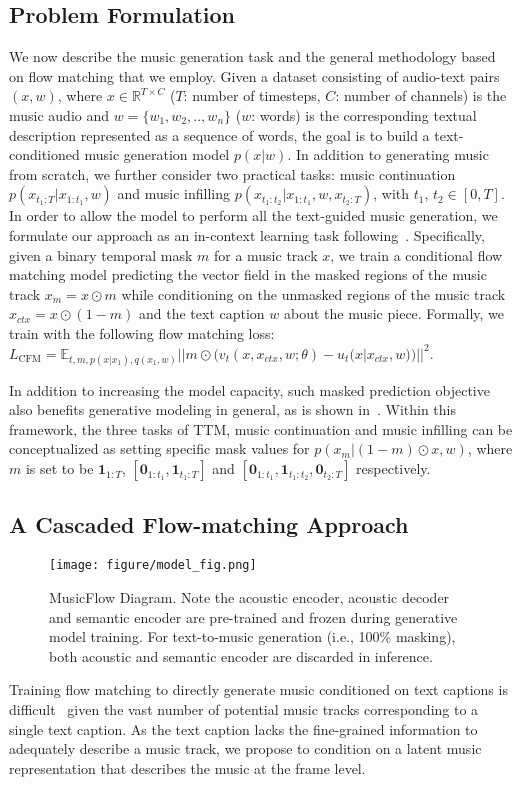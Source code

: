 \subsection{Problem Formulation}\label{sec:problem_formulation}
We now describe the music generation task and the general methodology based on flow matching that we employ.
Given a dataset consisting of audio-text pairs $(x, w)$, where $x\in\mathbb{R}^{T\times C}$ ($T$: number of timesteps, $C$: number of channels) is the music audio and $w=\{w_1,w_2,..,w_n\}$ ($w$: words) 
is the corresponding textual description represented as a sequence of words, the goal is to build a text-conditioned music generation model $p(x|w)$. In addition to generating music from scratch, we further consider two practical tasks: music continuation 
$p(x_{t_1:T}|x_{1:t_1}, w)$
and music infilling $p(x_{t_1:t_2}|x_{1:t_1}, w, x_{t_2:T})$, with $t_1$, $t_2\in[0,T]$.
In order to allow the model to perform all the text-guided music generation, we formulate our approach as an in-context learning task following~\cite{Le2023VoiceboxTM}. Specifically, given a binary temporal mask $m$ for a music track $x$, we train a conditional flow matching model predicting the vector field in the masked regions of the music track $x_{m} = x \odot m$ while conditioning on the
 unmasked regions of the music track $x_{ctx} = x \odot (1 - m)$ and the text caption $w$ about the music piece. Formally, we train with the following flow matching loss: $L_{\text{CFM}}=\mathbb{E}_{t,m,p(x|x_1),q(x_1,w)}||m\odot(v_t(x,x_{ctx},w;\theta)-u_t(x|x_{ctx},w))||^2$.
 
 In addition to increasing the model capacity, such masked prediction objective also benefits generative modeling in general, as is shown in~\cite{jen1,Le2023VoiceboxTM}. Within this framework, the three tasks of TTM, music continuation and music infilling can be conceptualized as setting specific mask values for $p(x_{m}|(1-m)\odot x,w)$, where $m$ is set to be $\mathbf{1}_{1:T}$, $[\mathbf{0}_{1:t_1},\mathbf{1}_{t_1:T}]$ and $[\mathbf{0}_{1:t_1},\mathbf{1}_{t_1:t_2},\mathbf{0}_{t_2:T}]$ respectively.

\subsection{A Cascaded Flow-matching Approach}
\begin{figure*}
    \centering
    \texttt{[image: figure/model\_fig.png]}
    \caption{MusicFlow Diagram. Note the acoustic encoder, acoustic decoder and semantic encoder are pre-trained and frozen during generative model training. For text-to-music generation (i.e., 100\% masking), both acoustic and semantic encoder are discarded in inference.
    }
    \label{fig:main_fig}
\end{figure*}
Training flow matching to directly generate music conditioned on text captions is difficult~\cite{audio-ldm2} given the vast number of potential music tracks corresponding to a single text caption. As the text caption lacks the fine-grained information to adequately describe a music track, we propose to condition on a latent music representation that describes the music at the frame level.

